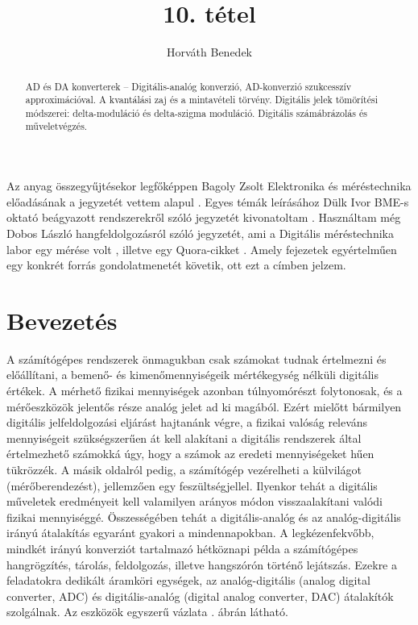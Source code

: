 \documentclass[12pt]{article}
\theoremstyle{plain}
\begin{document}
\title{10. tétel}
\author{Horváth Benedek}

\maketitle


\begin{abstract}
    AD és DA konverterek – Digitális-analóg konverzió, AD-konverzió szukcesszív approximációval. A kvantálási zaj és a mintavételi törvény. Digitális jelek tömörítési módszerei: delta-moduláció és delta-szigma moduláció. Digitális számábrázolás és műveletvégzés.
\end{abstract}

\vfill

\tableofcontents

\newpage

Az anyag összegyűjtésekor legfőképpen Bagoly Zsolt Elektronika és méréstechnika előadásának a jegyzetét vettem alapul \cite{Bagoly}. Egyes témák leírásához Dülk Ivor BME-s oktató beágyazott rendszerekről szóló jegyzetét kivonatoltam \cite{BME}. Használtam még Dobos László hangfeldolgozásról szóló jegyzetét, ami a Digitális méréstechnika labor egy mérése volt \cite{hangfeldolgozas}, illetve egy Quora-cikket \cite{quora}. Amely fejezetek egyértelműen egy konkrét forrás gondolatmenetét követik, ott ezt a címben jelzem.


\section{Bevezetés}

A számítógépes rendszerek önmagukban csak számokat tudnak értelmezni és előállítani, a bemenő- és kimenőmennyiségeik mértékegység nélküli digitális értékek. A mérhető fizikai mennyiségek azonban túlnyomórészt folytonosak, és a mérőeszközök jelentős része analóg jelet ad ki magából. Ezért mielőtt bármilyen digitális jelfeldolgozási eljárást hajtanánk végre, a fizikai valóság releváns mennyiségeit szükségszerűen át kell alakítani a digitális rendszerek által értelmezhető számokká úgy, hogy a számok az eredeti mennyiségeket hűen tükrözzék. A másik oldalról pedig, a számítógép vezérelheti a külvilágot (mérőberendezést), jellemzően egy feszültségjellel. Ilyenkor tehát a digitális műveletek eredményeit kell valamilyen arányos módon visszaalakítani valódi fizikai mennyiséggé. Összességében tehát a digitális-analóg és az analóg-digitális irányú átalakítás egyaránt gyakori a mindennapokban. A legkézenfekvőbb, mindkét irányú konverziót tartalmazó hétköznapi példa a számítógépes hangrögzítés, tárolás, feldolgozás, illetve hangszórón történő lejátszás. Ezekre a feladatokra dedikált áramköri egységek, az analóg-digitális (analog digital converter, ADC) és digitális-analóg (digital analog converter, DAC) átalakítók szolgálnak. Az eszközök egyszerű vázlata . ábrán látható. 
\end{document}
